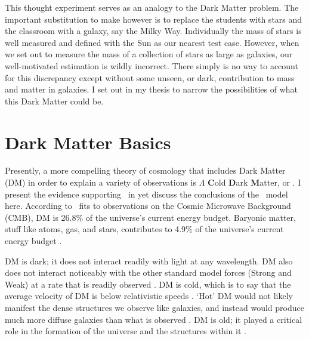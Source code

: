 This thought experiment serves as an analogy to the Dark Matter problem.
The important substitution to make however is to replace the students with stars and the classroom with a galaxy, say the Milky Way.
Individually the mass of stars is well measured and defined with the Sun as our nearest test case.
However, when we set out to measure the mass of a collection of stars as large as galaxies, our well-motivated estimation is wildly incorrect.
There simply is no way to account for this discrepancy except without some unseen, or dark, contribution to mass and matter in galaxies.
I set out in my thesis to narrow the possibilities of what this Dark Matter could be.

\section{Dark Matter Basics\label{sec:basicDM}}

Presently, a more compelling theory of cosmology that includes Dark Matter (DM) in order to explain a variety of observations is $\Lambda$ \textbf{C}old \textbf{D}ark \textbf{M}atter, or \lcdm.
I present the evidence supporting \lcdm~in  yet discuss the conclusions of the \lcdm~model here.
According to \lcdm~fits to observations on the Cosmic Microwave Background (CMB), DM is 26.8\% of the universe's current energy budget.
Baryonic matter, stuff like atoms, gas, and stars, contributes to 4.9\% of the universe's current energy budget \cite{Greene:cosmology_dm,Young:cosmology_dm,Bertone:particleDM}.


DM is dark; it does not interact readily with light at any wavelength.
DM also does not interact noticeably with the other standard model forces (Strong and Weak) at a rate that is readily observed \cite{Bertone:particleDM}.
DM is cold, which is to say that the average velocity of DM is below relativistic speeds \cite{Greene:cosmology_dm}.
`Hot' DM would not likely manifest the dense structures we observe like galaxies, and instead would produce much more diffuse galaxies than what is observed \cite{Bertone:particleDM,Greene:cosmology_dm}.
DM is old; it played a critical role in the formation of the universe and the structures within it \cite{Greene:cosmology_dm,Young:cosmology_dm}.

